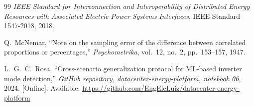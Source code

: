 \documentclass[journal]{IEEEtran}
\begin{document}
\begin{thebibliography}{99}
\textit{IEEE Standard for Interconnection and Interoperability of
Distributed Energy Resources with Associated Electric Power Systems
Interfaces}, IEEE Standard 1547-2018, 2018.

Q.~McNemar,
``Note on the sampling error of the difference between correlated
proportions or percentages,''
\textit{Psychometrika}, vol.~12, no.~2, pp.~153--157, 1947.

L.~G.~C.~Rosa,
``Cross-scenario generalization protocol for ML-based inverter mode
detection,''
\textit{GitHub repository, datacenter-energy-platform, notebook 06},
2024.
[Online]. Available: \url{https://github.com/EngEleLuiz/datacenter-energy-platform}

\end{thebibliography}
\end{document}
